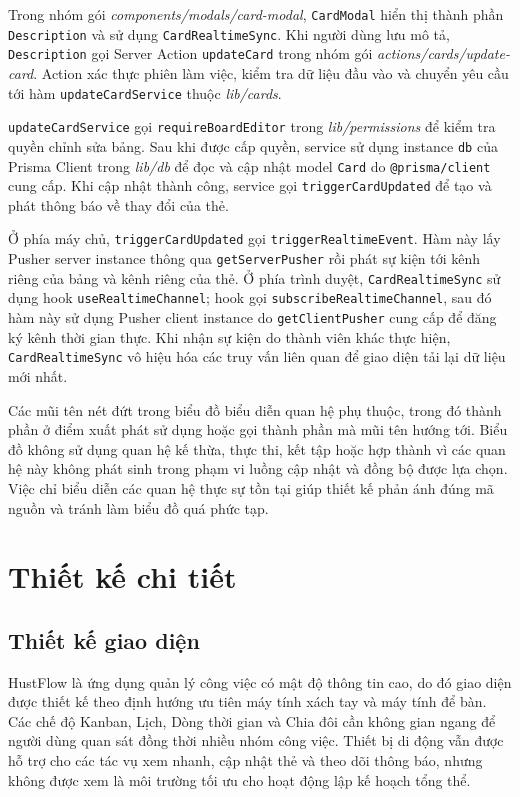 \documentclass[../DoAn.tex]{subfiles}
\begin{document}
Trong nhóm gói \textit{components/modals/card-modal}, \texttt{CardModal} hiển thị thành phần \texttt{Description} và sử dụng \texttt{CardRealtimeSync}. Khi người dùng lưu mô tả, \texttt{Description} gọi Server Action \texttt{updateCard} trong nhóm gói \textit{actions/cards/update-card}. Action xác thực phiên làm việc, kiểm tra dữ liệu đầu vào và chuyển yêu cầu tới hàm \texttt{updateCardService} thuộc \textit{lib/cards}.

\texttt{updateCardService} gọi \texttt{requireBoardEditor} trong \textit{lib/permissions} để kiểm tra quyền chỉnh sửa bảng. Sau khi được cấp quyền, service sử dụng instance \texttt{db} của Prisma Client trong \textit{lib/db} để đọc và cập nhật model \texttt{Card} do \texttt{@prisma/client} cung cấp. Khi cập nhật thành công, service gọi \texttt{triggerCardUpdated} để tạo và phát thông báo về thay đổi của thẻ.

Ở phía máy chủ, \texttt{triggerCardUpdated} gọi \texttt{triggerRealtimeEvent}. Hàm này lấy Pusher server instance thông qua \texttt{getServerPusher} rồi phát sự kiện tới kênh riêng của bảng và kênh riêng của thẻ. Ở phía trình duyệt, \texttt{CardRealtimeSync} sử dụng hook \texttt{useRealtimeChannel}; hook gọi \texttt{subscribeRealtimeChannel}, sau đó hàm này sử dụng Pusher client instance do \texttt{getClientPusher} cung cấp để đăng ký kênh thời gian thực. Khi nhận sự kiện do thành viên khác thực hiện, \texttt{CardRealtimeSync} vô hiệu hóa các truy vấn liên quan để giao diện tải lại dữ liệu mới nhất.

Các mũi tên nét đứt trong biểu đồ biểu diễn quan hệ phụ thuộc, trong đó thành phần ở điểm xuất phát sử dụng hoặc gọi thành phần mà mũi tên hướng tới. Biểu đồ không sử dụng quan hệ kế thừa, thực thi, kết tập hoặc hợp thành vì các quan hệ này không phát sinh trong phạm vi luồng cập nhật và đồng bộ được lựa chọn. Việc chỉ biểu diễn các quan hệ thực sự tồn tại giúp thiết kế phản ánh đúng mã nguồn và tránh làm biểu đồ quá phức tạp.

\section{Thiết kế chi tiết}
\label{section:4.2}

\subsection{Thiết kế giao diện}
\label{subsection:4.2.1}

HustFlow là ứng dụng quản lý công việc có mật độ thông tin cao, do đó giao diện được thiết kế theo định hướng ưu tiên máy tính xách tay và máy tính để bàn. Các chế độ Kanban, Lịch, Dòng thời gian và Chia đôi cần không gian ngang để người dùng quan sát đồng thời nhiều nhóm công việc. Thiết bị di động vẫn được hỗ trợ cho các tác vụ xem nhanh, cập nhật thẻ và theo dõi thông báo, nhưng không được xem là môi trường tối ưu cho hoạt động lập kế hoạch tổng thể.
\end{document}

